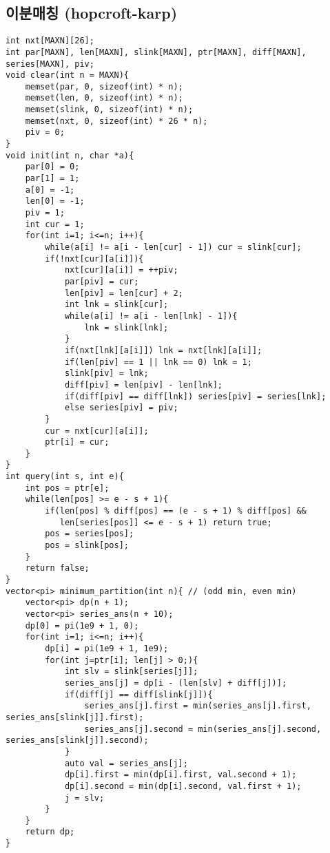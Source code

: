 \documentclass[landscape, 8pt, a4paper, oneside, twocolumn]{extarticle}
\begin{document}
\subsection{이분매칭 (hopcroft-karp)}
\begin{verbatim}
int nxt[MAXN][26];
int par[MAXN], len[MAXN], slink[MAXN], ptr[MAXN], diff[MAXN], series[MAXN], piv;
void clear(int n = MAXN){
	memset(par, 0, sizeof(int) * n);
	memset(len, 0, sizeof(int) * n);
	memset(slink, 0, sizeof(int) * n);
	memset(nxt, 0, sizeof(int) * 26 * n);
	piv = 0;
}
void init(int n, char *a){
	par[0] = 0;
	par[1] = 1;
	a[0] = -1;
	len[0] = -1;
	piv = 1;
	int cur = 1;
	for(int i=1; i<=n; i++){
		while(a[i] != a[i - len[cur] - 1]) cur = slink[cur];
		if(!nxt[cur][a[i]]){
			nxt[cur][a[i]] = ++piv;
			par[piv] = cur;
			len[piv] = len[cur] + 2;
			int lnk = slink[cur];
			while(a[i] != a[i - len[lnk] - 1]){
				lnk = slink[lnk];
			}
			if(nxt[lnk][a[i]]) lnk = nxt[lnk][a[i]];
			if(len[piv] == 1 || lnk == 0) lnk = 1;
			slink[piv] = lnk;
			diff[piv] = len[piv] - len[lnk];
			if(diff[piv] == diff[lnk]) series[piv] = series[lnk];
			else series[piv] = piv;
		}
		cur = nxt[cur][a[i]];
		ptr[i] = cur;
	}
}
int query(int s, int e){
	int pos = ptr[e];
	while(len[pos] >= e - s + 1){
        if(len[pos] % diff[pos] == (e - s + 1) % diff[pos] &&
           len[series[pos]] <= e - s + 1) return true;
        pos = series[pos];
        pos = slink[pos];
	}
	return false;
}
vector<pi> minimum_partition(int n){ // (odd min, even min)
	vector<pi> dp(n + 1);
	vector<pi> series_ans(n + 10);
	dp[0] = pi(1e9 + 1, 0);
	for(int i=1; i<=n; i++){
		dp[i] = pi(1e9 + 1, 1e9);
		for(int j=ptr[i]; len[j] > 0;){
			int slv = slink[series[j]];
			series_ans[j] = dp[i - (len[slv] + diff[j])];
			if(diff[j] == diff[slink[j]]){
				series_ans[j].first = min(series_ans[j].first, series_ans[slink[j]].first);
				series_ans[j].second = min(series_ans[j].second, series_ans[slink[j]].second);
			}
			auto val = series_ans[j];
			dp[i].first = min(dp[i].first, val.second + 1);
			dp[i].second = min(dp[i].second, val.first + 1);
			j = slv;
		}
	}
	return dp;
}
\end{verbatim}
\end{document}
